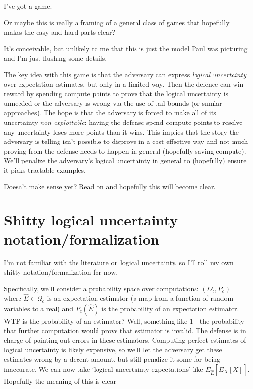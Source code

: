\documentclass{pset}
\begin{document}
I've got a game. 

Or maybe this is really a framing of a general class of games that hopefully
makes the easy and hard parts clear?

It's conceivable, but unlikely to me that this is just the model Paul was
picturing and I'm just flushing some details.

The key idea with this game is that the adversary can express \textit{logical
uncertainty} over expectation estimates, but only in a limited way. Then the
defence can win reward by spending compute points to prove that the logical
uncertainty is unneeded or the adversary is wrong via the use of tail bounds
(or similar approaches). The hope is that the adversary is forced to make all
of its uncertainty \textit{non-exploitable}: having the defense spend compute
points to resolve any uncertainty loses more points than it wins. This implies
that the story the adversary is telling isn't possible to disprove in a cost
effective way and not much proving from the defense needs to happen in general
(hopefully saving compute). We'll penalize the adversary's logical uncertainty
in general to (hopefully) ensure it picks tractable examples. 

Doesn't make sense yet? Read on and hopefully this will become clear.

\section{Shitty logical uncertainty notation/formalization}

I'm not familiar with the literature on logical uncertainty, so I'll roll my
own shitty notation/formalization for now.

Specifically, we'll consider a probability space over computations: $(\Omega_c,
P_c)$ where $\hat{E} \in \Omega_c$ is an expectation estimator (a map from a
function of random variables to a real) and $P_c(\hat{E})$ is the probability
of an expectation estimator. WTF is the probability of an estimator?
Well, something like 1 - the probability that further computation would
prove that estimator is invalid. The defense is in charge of pointing
out errors in these estimators. Computing perfect estimates of
logical uncertainty is likely expensive, so we'll let the adversary get
these estimates wrong by a decent amount, but still penalize it
some for being inaccurate. We can now take `logical uncertainty expectations'
like $E_{\hat{E}}[\hat{E}_X[X]]$. Hopefully the meaning of this is clear.
\end{document}
